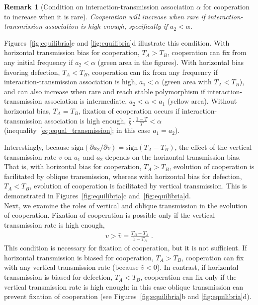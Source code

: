 \documentclass[12pt]{extarticle}
\newtheorem{remark}{Remark}
\begin{document}
\begin{remark}[Condition on interaction-transmission association $\alpha$ for cooperation to increase when it is rare]
\label{remark:intermediate_association_res3}
Cooperation will increase when rare if interaction-transmission association is high enough, specifically if $a_2 < \alpha$.
\end{remark}
Figures~\ref{fig:equilibria}c and \ref{fig:equilibria}d illustrate this condition.
With horizontal transmission bias for cooperation, $T_A>T_B$, cooperation can fix from any initial frequency if $a_2<\alpha$ (green area in the figures). 
With horizontal bias favoring defection, $T_A<T_B$, cooperation can fix from any frequency if interaction-transmission association is high, $a_1<\alpha$ (green area with $T_A<T_B$), and can also increase when rare and reach stable polymorphism if interaction-transmission association is intermediate, $a_2<\alpha<a_1$ (yellow area).
Without horizontal bias, $T_A=T_B$, fixation of cooperation occurs if interaction-transmission association is high enough, $\frac{c}{b} \cdot \frac{1-T}{T} < \alpha$ (inequality~\ref{eq:equal_transmission}; in this case $a_1=a_2$).

Interestingly, because $\text{sign} (\partial a_2 / \partial v) = \text{sign} (T_A-T_B)$, the effect of the vertical transmission rate $v$ on $a_1$ and $a_2$ depends on the horizontal transmission bias. 
That is, with horizontal bias for cooperation, $T_A>T_B$, evolution of cooperation is facilitated by oblique transmission, whereas with horizontal bias for defection, $T_A<T_B$, evolution of cooperation is facilitated by vertical transmission.
This is demonstrated in Figures~\ref{fig:equilibria}c and~\ref{fig:equilibria}d.
\\

Next, we examine the roles of vertical and oblique transmission in the evolution of cooperation.
Fixation of cooperation is possible only if the vertical transmission rate is high enough,
  \begin{equation} \label{eq:fixation_of_cooperation_vertical_transmission_condition}
    \begin{aligned}
      v>\hat{v} = \frac{T_B - T_A}{1-T_A} \;.
    \end{aligned}
    \end{equation} 
This condition is necessary for fixation of cooperation, but it is not sufficient.
If horizontal transmission is biased for cooperation, $T_A>T_B$, cooperation can fix with any vertical transmission rate (because $\hat{v}<0$).
In contrast, if horizontal transmission is biased for defection, $T_A<T_B$,  cooperation can fix only if the vertical transmission rate is high enough: in this case oblique transmission can prevent fixation of cooperation (see Figures~\ref{fig:equilibria}b and \ref{fig:equilibria}d).
\end{document}
